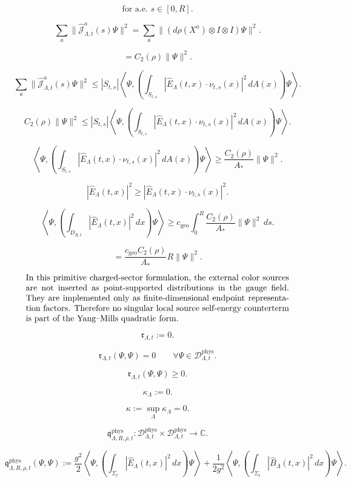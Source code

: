 \documentclass[11pt]{article}
\begin{document}
\[
\text{for a.e. }s\in[0,R].
\]

\[
\sum_a
\|\widehat{\mathcal J}_{\Lambda,t}^a(s)\Psi\|^2
=
\sum_a
\|(d\rho(X^a)\otimes I\otimes I)\Psi\|^2.
\]

\[
=
C_2(\rho)\|\Psi\|^2.
\]

\[
\sum_a
\|\widehat{\mathcal J}_{\Lambda,t}^a(s)\Psi\|^2
\le
|S_{t,s}|
\left\langle
\Psi,
\left(
\int_{S_{t,s}}
|\widehat E_\Lambda(t,x)\cdot\nu_{t,s}(x)|^2\,dA(x)
\right)\Psi
\right\rangle.
\]

\[
C_2(\rho)\|\Psi\|^2
\le
|S_{t,s}|
\left\langle
\Psi,
\left(
\int_{S_{t,s}}
|\widehat E_\Lambda(t,x)\cdot\nu_{t,s}(x)|^2\,dA(x)
\right)\Psi
\right\rangle.
\]

\[
\left\langle
\Psi,
\left(
\int_{S_{t,s}}
|\widehat E_\Lambda(t,x)\cdot\nu_{t,s}(x)|^2\,dA(x)
\right)\Psi
\right\rangle
\ge
\frac{C_2(\rho)}{A_\ast}\|\Psi\|^2.
\]

\[
|\widehat E_\Lambda(t,x)|^2
\ge
|\widehat E_\Lambda(t,x)\cdot\nu_{t,s}(x)|^2.
\]

\[
\left\langle
\Psi,
\left(
\int_{D_{R,t}}
|\widehat E_\Lambda(t,x)|^2\,dx
\right)\Psi
\right\rangle
\ge
c_{\mathrm{geo}}
\int_0^R
\frac{C_2(\rho)}{A_\ast}\|\Psi\|^2\,ds.
\]

\[
=
\frac{c_{\mathrm{geo}}C_2(\rho)}{A_\ast}R\|\Psi\|^2.
\]

\[
\parbox{0.9\linewidth}{
In this primitive charged-sector formulation, the external color sources are not
inserted as point-supported distributions in the gauge field.  They are
implemented only as finite-dimensional endpoint representation factors.
Therefore no singular local source self-energy counterterm is part of the
Yang--Mills quadratic form.
}
\]

\[
\mathfrak r_{\Lambda,t}
:=
0.
\]

\[
\mathfrak r_{\Lambda,t}(\Psi,\Psi)=0
\qquad
\forall\Psi\in\mathscr D_{\Lambda,t}^{\mathrm{phys}}.
\]

\[
\mathfrak r_{\Lambda,t}(\Psi,\Psi)
\ge
0.
\]

\[
\kappa_\Lambda:=0.
\]

\[
\kappa:=\sup_\Lambda\kappa_\Lambda=0.
\]

\[
\mathfrak q_{\Lambda,R,\rho,t}^{\mathrm{phys}}:
\mathscr D_{\Lambda,t}^{\mathrm{phys}}
\times
\mathscr D_{\Lambda,t}^{\mathrm{phys}}
\to\mathbb C.
\]

\[
\mathfrak q_{\Lambda,R,\rho,t}^{\mathrm{phys}}(\Psi,\Psi)
:=
\frac{g^2}{2}
\left\langle
\Psi,
\left(
\int_{\Sigma_t}
|\widehat E_\Lambda(t,x)|^2\,dx
\right)\Psi
\right\rangle
+
\frac{1}{2g^2}
\left\langle
\Psi,
\left(
\int_{\Sigma_t}
|\widehat B_\Lambda(t,x)|^2\,dx
\right)\Psi
\right\rangle.
\]
\end{document}
